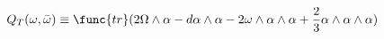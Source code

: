 \begin{equation}
Q_{T}(\omega ,\bar{\omega})\equiv\func{tr}(2\Omega\wedge \alpha -
d\alpha\wedge \alpha - 2\omega\wedge \alpha \wedge \alpha
+\frac{2}{3}\alpha \wedge \alpha \wedge \alpha ) \label{eqn:T3F}
\end{equation}


